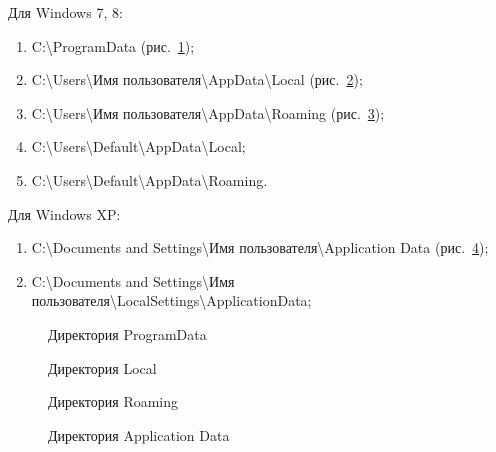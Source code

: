Для Windows 7, 8:

\begin{enumerate}
  \item C:\textbackslash ProgramData (рис.~\ref{kucher_5:kucher_5});
  \item C:\textbackslash Users\textbackslash Имя пользователя\textbackslash AppData\textbackslash Local (рис.~\ref{kucher_6:kucher_6});
  \item C:\textbackslash Users\textbackslash Имя пользователя\textbackslash AppData\textbackslash Roaming (рис.~\ref{kucher_7:kucher_7});
  \item C:\textbackslash Users\textbackslash Default\textbackslash AppData\textbackslash Local;
  \item C:\textbackslash Users\textbackslash Default\textbackslash AppData\textbackslash Roaming.
\end{enumerate}

Для Windows XP:

\begin{enumerate}
  \item C:\textbackslash Documents and Settings\textbackslash Имя пользователя\textbackslash Application Data (рис.~\ref{kucher_8:kucher_8});
  \item C:\textbackslash Documents and Settings\textbackslash Имя пользователя\textbackslash LocalSettings\textbackslash ApplicationData;
\end{enumerate}

\begin{figure}[h!]
\caption{Директория ProgramData}
\label{kucher_5:kucher_5}
\end{figure} 

\begin{figure}[h!]
\caption{Директория Local}
\label{kucher_6:kucher_6}
\end{figure} 

\begin{figure}[h!]
\caption{Директория Roaming}
\label{kucher_7:kucher_7}
\end{figure} 

\begin{figure}[h!]
\caption{Директория Application Data}
\label{kucher_8:kucher_8}
\end{figure} 

\clearpage
